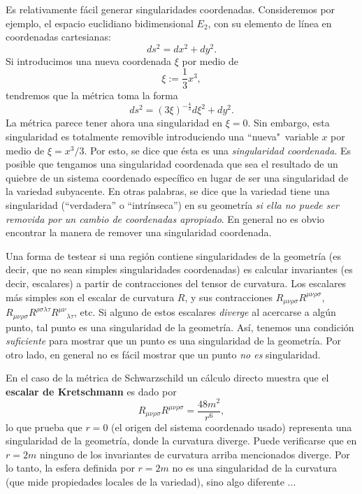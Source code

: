 Es relativamente fácil generar singularidades coordenadas. Consideremos por ejemplo, el espacio euclidiano bidimensional $E_2$, con su elemento de línea en coordenadas cartesianas:
\begin{equation}
ds^2=dx^2+dy^2.
\end{equation}
Si introducimos una nueva coordenada $\xi$ por medio de
\begin{equation}
\xi:=\frac{1}{3}x^3,
\end{equation}
tendremos que la métrica toma la forma%
\begin{equation}
ds^2 =\left( 3\xi\right) ^{-\frac{4}{3}}d\xi^2+dy^2.
\end{equation}
La métrica parece tener ahora una singularidad en $\xi=0$. Sin embargo, esta
singularidad es totalmente removible introduciendo una ``nueva"\, variable $x$ por
medio de $\xi=x^3/3$. Por esto, se dice que ésta es una
\textit{singularidad coordenada}. Es posible que tengamos una singularidad coordenada que sea el resultado de un quiebre de un sistema coordenado específico en lugar de ser una singularidad de la variedad subyacente. En otras palabras, se dice que la variedad tiene una singularidad (``verdadera'' o ``intrínseca'') en su geometría \textit{si ella no puede ser removida por un cambio de coordenadas apropiado}. En general no es obvio encontrar la manera de remover una singularidad coordenada.

Una forma de testear si una región contiene singularidades de la geometría (es decir, que no sean simples singularidades coordenadas) es calcular invariantes (es decir, escalares) a partir de contracciones del tensor de curvatura. Los escalares más simples son el escalar de curvatura
$R$, y sus contracciones $R_{\mu\nu\rho\sigma}R^{\mu\nu\rho\sigma}$, $R_{\mu\nu\rho\sigma}R^{\rho\sigma\lambda\tau}R^{\mu\nu}{}_{\lambda\tau}$, etc. Si alguno de estos escalares \textit{diverge} al acercarse a algún punto, tal punto es una singularidad de la geometría. Así, tenemos una condición \textit{suficiente}
para mostrar que un punto es una singularidad de la geometría. Por otro lado, en general no es fácil mostrar que un punto \textit{no es} singularidad.

En el caso de la métrica de Schwarzschild un cálculo directo muestra que el \textbf{escalar de Kretschmann} es dado por
\begin{equation}
R_{\mu\nu\rho\sigma}R^{\mu\nu\rho\sigma}=\frac{48m^2}{r^6},
\end{equation}
lo que prueba que $r=0$ (el origen del sistema coordenado usado) representa una
singularidad de la geometría, donde la curvatura diverge. Puede verificarse que en $r=2m$ ninguno de los invariantes de curvatura arriba mencionados diverge. Por lo tanto, la esfera definida por $r=2m$ no es una singularidad de la curvatura (que mide propiedades locales de la variedad), sino algo diferente ...

